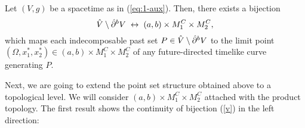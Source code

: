 \begin{prop}\label{structuraparcialsininfinito'}
  Let $(V,g)$ be a {\multiwarped} spacetime as in (\ref{eq:1-aux}). Then, there exists a bijection
  \begin{equation}\label{v}
\hat{V}\setminus \hat{\partial}^{{\color{black} b}} V\; \leftrightarrow\; (a,b)\times M_1^C\times M_2^C,
    \end{equation}
    which maps each indecomposable past set $P\in\hat{V}\setminus \hat{\partial}^{{\color{black} b}}V$ to the limit point $(\Omega,x^*_1,x^*_2)\in (a,b)\times M_1^C\times M_2^C$ of any future-directed timelike curve generating $P$.
    \end{prop}


\smallskip

Next, we are going to extend the point set structure obtained above to a topological level. We will consider $(a,b)\times M_1^C\times M_2^C$ attached with the product topology. The first result shows the continuity of bijection (\ref{v}) in the left direction:

